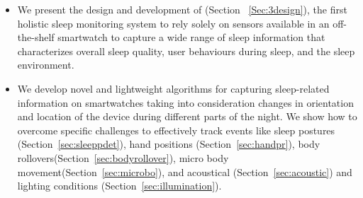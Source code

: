 \begin{itemize}[noitemsep]
	\item We present the design and development of \systemname (Section ~\ref{Sec:3design}), the first holistic sleep monitoring system to rely solely on sensors
available in an off-the-shelf smartwatch to capture a wide range of sleep information that characterizes overall sleep quality, user
behaviours during sleep, and the sleep environment.
	
\item We develop novel and lightweight algorithms for capturing sleep-related information on smartwatches taking into consideration
    changes in orientation and location of the device during different parts of the night. We show how to overcome specific challenges to
    effectively track events like sleep postures (Section~\ref{sec:sleeppdet}), hand positions (Section~\ref{sec:handpr}), body
    rollovers(Section~\ref{sec:bodyrollover}), micro body movement(Section~\ref{sec:microbo}), and acoustical (Section~\ref{sec:acoustic}) and
    lighting conditions (Section~\ref{sec:illumination}).



\end{itemize}
